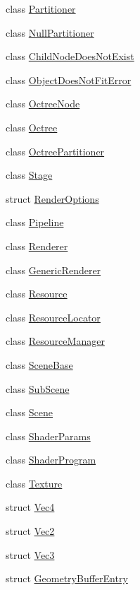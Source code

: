 \begin{DoxyCompactItemize}
class \hyperlink{classkglt_1_1_partitioner}{Partitioner}
\item 
class \hyperlink{classkglt_1_1_null_partitioner}{Null\-Partitioner}
\item 
class \hyperlink{classkglt_1_1_child_node_does_not_exist}{Child\-Node\-Does\-Not\-Exist}
\item 
class \hyperlink{classkglt_1_1_object_does_not_fit_error}{Object\-Does\-Not\-Fit\-Error}
\item 
class \hyperlink{classkglt_1_1_octree_node}{Octree\-Node}
\item 
class \hyperlink{classkglt_1_1_octree}{Octree}
\item 
class \hyperlink{classkglt_1_1_octree_partitioner}{Octree\-Partitioner}
\item 
class \hyperlink{classkglt_1_1_stage}{Stage}
\item 
struct \hyperlink{structkglt_1_1_render_options}{Render\-Options}
\item 
class \hyperlink{classkglt_1_1_pipeline}{Pipeline}
\item 
class \hyperlink{classkglt_1_1_renderer}{Renderer}
\item 
class \hyperlink{classkglt_1_1_generic_renderer}{Generic\-Renderer}
\item 
class \hyperlink{classkglt_1_1_resource}{Resource}
\item 
class \hyperlink{classkglt_1_1_resource_locator}{Resource\-Locator}
\item 
class \hyperlink{classkglt_1_1_resource_manager}{Resource\-Manager}
\item 
class \hyperlink{classkglt_1_1_scene_base}{Scene\-Base}
\item 
class \hyperlink{classkglt_1_1_sub_scene}{Sub\-Scene}
\item 
class \hyperlink{classkglt_1_1_scene}{Scene}
\item 
class \hyperlink{classkglt_1_1_shader_params}{Shader\-Params}
\item 
class \hyperlink{classkglt_1_1_shader_program}{Shader\-Program}
\item 
class \hyperlink{classkglt_1_1_texture}{Texture}
\item 
struct \hyperlink{structkglt_1_1_vec4}{Vec4}
\item 
struct \hyperlink{structkglt_1_1_vec2}{Vec2}
\item 
struct \hyperlink{structkglt_1_1_vec3}{Vec3}
\item 
struct \hyperlink{structkglt_1_1_geometry_buffer_entry}{Geometry\-Buffer\-Entry}

\end{DoxyCompactItemize}
